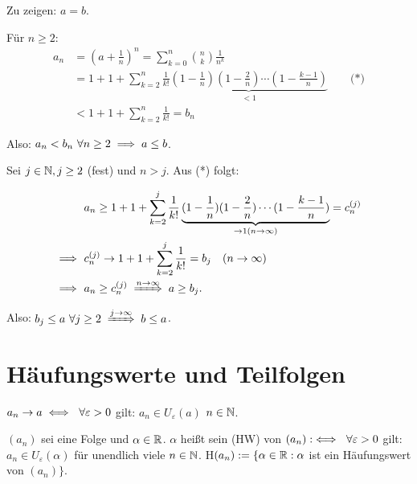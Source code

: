 \documentclass[a4paper,twoside,DIV15,BCOR12mm]{scrbook}
\begin{document}
Zu zeigen: $a=b$.

Für $n\ge2$:
\begin{align*}
a_n&=(a+\frac{1}{n})^n=\sum_{k=0}^n{\binom{n}{k}\frac{1}{n^k}} \\
&=1+1+\sum_{k=2}^{n}{\frac{1}{k!}\underbrace{(1-\frac{1}{n})(1-\frac{2}{n})\cdots(1-\frac{k-1}{n})}_{<1}}\qquad\text{(*)} \\
&<1+1+\sum_{k=2}^n{\frac{1}{k!}}=b_n
\end{align*}

Also: $a_n<b_n\ \forall n\ge2 \implies a\le b$.

Sei $j\in\mathbb{N}, j\ge 2$ (fest) und $n>j$. Aus (*) folgt:


\begin{align*}
& a_n\ge 1+1+\sum_{k=2}^{j}{\frac{1}{k!}\underbrace{(1-\frac{1}{n})(1-\frac{2}{n})\cdots(1-\frac{k-1}{n})}_{\rightarrow 1(n \rightarrow \infty)}} = c_n^{(j)} \\
\folgt\ & c_n^{(j)} \rightarrow 1+1+\sum_{k=2}^j{\frac{1}{k!}}=b_j\quad(n \rightarrow \infty) \\
\folgt\ & a_n\ge c_n^{(j)} \folgtwegen{n \rightarrow \infty} a\ge b_j\text{.} \\
\end{align*}

Also: $b_j\le a\ \forall j\ge 2 \folgtwegen{j \rightarrow \infty} b\le a$.

\chapter{Häufungswerte und Teilfolgen}

\begin{erinnerung}
$a_n \to a \iff\ \forall \varepsilon > 0$ gilt: $a_n \in  U_\varepsilon(a)$ \ffa $n \in\mathbb{N}$.
\end{erinnerung}

\begin{definition}[Häufungwerte]
$(a_n)$ sei eine Folge und $\alpha \in\mathbb{R}$. $\alpha$ heißt sein  (HW) von $(a_n) :\iff\ \forall \varepsilon > 0$ gilt: $a_n \in  U_\varepsilon(\alpha)$ für unendlich viele $n\in\mathbb{N}$. H$(a_n) := \{\alpha\in\mathbb{R}: \alpha$ ist ein Häufungswert von $(a_n) \}$.
\end{definition}
\end{document}
